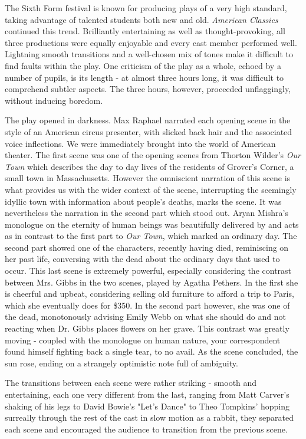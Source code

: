 The Sixth Form festival is known for producing plays of a very high
standard, taking advantage of talented students both new and old.
\textit{American Classics} continued this trend. Brilliantly entertaining
as well as thought-provoking, all three productions were equally
enjoyable and every cast member performed well. Lightning smooth
transitions and a well-chosen mix of tones make it difficult to find
faults within the play. One criticism of the play as a whole, echoed by
a number of pupils, is its length - at almost three hours long, it was
difficult to comprehend subtler aspects. The three hours, however,
proceeded unflaggingly, without inducing boredom.

The play opened in darkness. Max Raphael narrated each opening scene in
the style of an American circus presenter, with slicked back hair and
the associated voice inflections. We were immediately brought into the
world of American theater. The first scene was one of the opening scenes
from Thorton Wilder's \textit{Our Town} which describes the day to day
lives of the residents of Grover's Corner, a small town in
Massachusetts. However the omniscient narration of this scene is what
provides us with the wider context of the scene, interrupting the
seemingly idyllic town with information about people's deaths, marks the
scene. It was nevertheless the narration in the second part which stood
out. Aryan Mishra's monologue on the eternity of human beings was
beautifully delivered by and acts as in contrast to the first part to
\textit{Our Town}, which marked an ordinary day. The second part showed
one of the characters, recently having died, reminiscing on her past
life, conversing with the dead about the ordinary days that used to
occur. This last scene is extremely powerful, especially considering the
contrast between Mrs. Gibbs in the two scenes, played by Agatha Pethers.
In the first she is cheerful and upbeat, considering selling old
furniture to afford a trip to Paris, which she eventually does for
\$350. In the second part however, she was one of the dead, monotonously
advising Emily Webb on what she should do and not reacting when Dr.
Gibbs places flowers on her grave. This contrast was greatly moving -
coupled with the monologue on human nature, your correspondent found
himself fighting back a single tear, to no avail. As the scene
concluded, the sun rose, ending on a strangely optimistic note full of
ambiguity.

The transitions between each scene were rather striking - smooth and
entertaining, each one very different from the last, ranging from Matt
Carver's shaking of his legs to David Bowie's "Let's Dance" to Theo
Tompkins' hopping surreally through the rest of the cast in slow motion
as a rabbit, they separated each scene and encouraged the audience to
transition from the previous scene.

